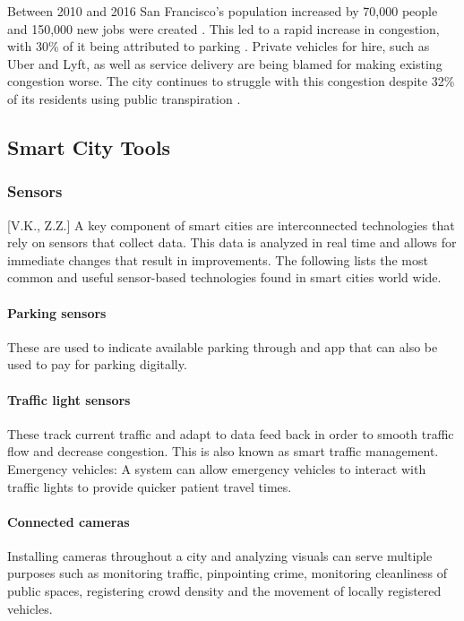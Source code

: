 \documentclass[12pt]{article}                       %
\begin{document}
Between 2010 and 2016 San Francisco's population increased by 70,000 people and 150,000 new jobs were created \cite{Marshall2018UberComplicated}. This led to a rapid increase in congestion, with 30\% of it being attributed to parking \cite{Marshall2018UberComplicated}. Private vehicles for hire, such as Uber and Lyft, as well as service delivery are being blamed for making existing congestion worse. The city continues to struggle with this congestion despite 32\% of its residents using public transpiration \cite{Marshall2018UberComplicated}. 

\subsection{Smart City Tools}
\subsubsection{Sensors}[V.K., Z.Z.]
A key component of smart cities are interconnected technologies that rely on sensors that collect data. This data is analyzed in real time and allows for immediate changes that result in improvements. The following lists the most common and useful sensor-based technologies found in smart cities world wide. 

\paragraph{Parking sensors} These are used to indicate available parking through and app that can also be used to pay for parking digitally.

\paragraph{Traffic light sensors} These track current traffic and adapt to data feed back in order to smooth traffic flow and decrease congestion. This is also known as smart traffic management.    
Emergency vehicles: A system can allow emergency vehicles to interact with traffic lights to provide quicker patient travel times.

\paragraph{Connected cameras} Installing cameras throughout a city and analyzing visuals can serve multiple purposes such as monitoring traffic, pinpointing crime, monitoring cleanliness of public spaces, registering crowd density and the movement of locally registered vehicles.
\end{document}

